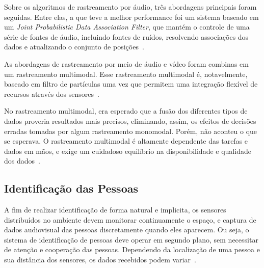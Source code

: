 	

Sobre os algoritmos de rastreamento por áudio, três abordagens principais foram seguidas. Entre elas, a que teve a melhor performance foi um sistema baseado em um \textit{Joint Probabilistic Data Association Filter}, que mantém o controle de uma série de fontes de áudio, incluindo fontes de ruídos, resolvendo associações dos dados e atualizando o conjunto de posições~\cite{chil}.

As abordagens de rastreamento por meio de áudio e vídeo foram combinas em um rastreamento multimodal. Esse rastreamento multimodal é, notavelmente, baseado em filtro de partículas uma vez que permitem uma integração flexível de recursos através dos sensores~\cite{chil}.

No rastreamento multimodal, era esperado que a fusão dos diferentes tipos de dados proveria resultados mais precisos, eliminando, assim, os efeitos de decisões erradas tomadas por algum rastreamento monomodal. Porém, não aconteu o que se esperava. O rastreamento multimodal é altamente dependente das tarefas e dados em mãos, e exige um cuidadoso equilíbrio na disponibilidade e qualidade dos dados~\cite{chil}.

\subsection{Identificação das Pessoas}


A fim de realizar identificação de forma natural e implicita, os sensores distribuídos no ambiente devem monitorar continuamente o espaço, e captura de dados audiovisual das pessoas discretamente quando eles aparecem. Ou seja, o sistema de identificação de pessoas
deve operar em segundo plano, sem necessitar de atenção e cooperação das pessoas. Dependendo da localização de uma pessoa e sua distância dos sensores, os dados recebidos podem variar~\cite{chil}. 

